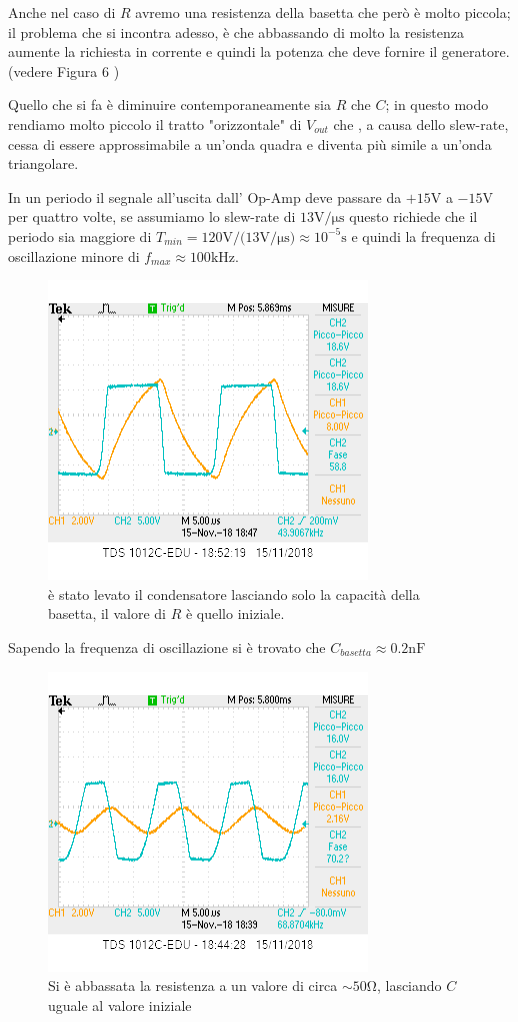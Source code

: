 \documentclass[10pt,a4paper]{article}
\begin{document}
Anche nel caso di $R$ avremo una resistenza della basetta che però è molto piccola; il problema che si incontra adesso, è che abbassando di molto la resistenza aumente la richiesta in corrente e quindi la potenza che deve fornire il generatore. (vedere Figura 6 )

Quello che si fa è  diminuire contemporaneamente sia $R$ che $C$; in questo modo rendiamo molto piccolo il tratto "orizzontale" di $V_{out}$ che , a causa dello slew-rate,  cessa di essere approssimabile a un'onda quadra  e diventa più simile a un'onda triangolare.

In un periodo il  segnale all'uscita dall' Op-Amp deve passare da $+15\si\volt$ a $-15\si\volt$ per quattro volte, se  assumiamo lo slew-rate di  $13 \si{\volt\per\micro\second}$ questo richiede che il periodo sia maggiore di $T_{min} = 120\si\volt / (13 \si{\volt\per\micro\second) }\approx 10^{-5}\si\second$ e quindi la frequenza di oscillazione minore di $f_{max}\approx 100 \si{\kilo \hertz}$.
\begin{figure}[h]
	\centering
	\includegraphics[scale=0.8]{basetta.png}
	\caption{\small è stato levato il condensatore lasciando solo la capacità della basetta, il valore di $R$ è quello iniziale.}
	\label{fig:basetta}
\end{figure}

Sapendo la frequenza di oscillazione si è trovato che $C_{basetta} \approx 0.2 \si{\nano \farad}$
\begin{figure}[h]

	\centering
	\includegraphics[scale=0.8]{freqRbassa.png}
	\caption{\small Si è abbassata la resistenza a un valore di circa $\sim 50 \si \ohm$, lasciando $C$ uguale al valore iniziale}
	\label{fig: resbassa }

\end{figure}
\end{document}
